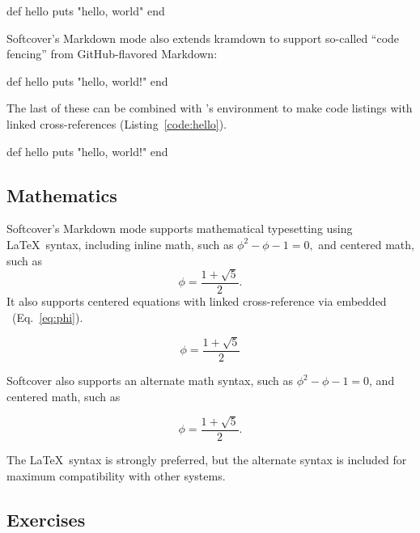 \begin{code}
def hello
  puts "hello, world"
end
\end{code}

Softcover{}'s Markdown mode also extends kramdown to support so-called {}``code fencing{}'' from GitHub-flavored Markdown:

\begin{code}
def hello
  puts "hello, world!"
end
\end{code}

The last of these can be combined with \PolyTeX{}'s  environment to make code listings with linked cross-references (Listing~\ref{code:hello}).

\begin{codelisting}
\label{code:hello}
\begin{code}
def hello
  puts "hello, world!"
end
\end{code}
\end{codelisting}

\subsection{Mathematics}

Softcover{}'s Markdown mode supports mathematical typesetting using \LaTeX\ syntax, including inline math, such as \( \phi^2 - \phi - 1 = 0, \) and centered math, such as
\[ \phi = \frac{1+\sqrt{5}}{2}. \]
It also supports centered equations with linked cross-reference via embedded \PolyTeX\ (Eq.~\eqref{eq:phi}).

\begin{equation}
\label{eq:phi}
\phi = \frac{1+\sqrt{5}}{2}
\end{equation}

Softcover also supports an alternate math syntax, such as \(\phi^2 - \phi - 1 = 0\), and centered math, such as

\[\phi = \frac{1+\sqrt{5}}{2}.\]

The \LaTeX\ syntax is strongly preferred, but the alternate syntax is included for maximum compatibility with other systems.




\subsection{Exercises}


